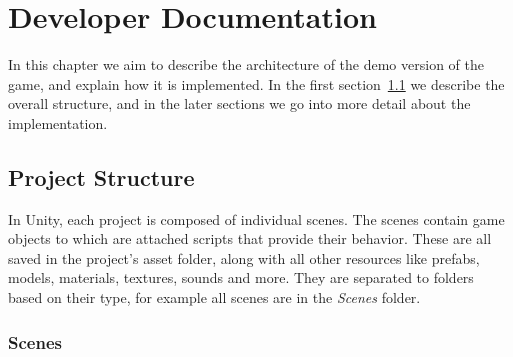 \chapter{Developer Documentation}

In this chapter we aim to describe the architecture of the demo version of the game, and explain how it is implemented.
In the first section~\ref{sec:docs-proj} we describe the overall structure, and in the later sections we go into more detail about the implementation.

\section{Project Structure}\label{sec:docs-proj}

In Unity, each project is composed of individual scenes.
The scenes contain game objects to which are attached scripts that provide their behavior.
These are all saved in the project's asset folder, along with all other resources like prefabs, models, materials, textures, sounds and more.
They are separated to folders based on their type, for example all scenes are in the \emph{Scenes} folder.

\subsection{Scenes}

